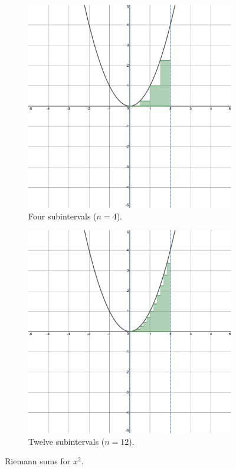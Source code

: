 \documentclass{article}
\begin{document}
\begin{figure}[h!]
    \centering
    \begin{subfigure}[b]{0.4\linewidth}
        \includegraphics[width=\linewidth]{Blender/Rsum4.png}
        \caption{Four subintervals ($n=4$).}
        \label{fig:4a}
    \end{subfigure}\hspace{3em}
    \begin{subfigure}[b]{0.4\linewidth}
        \includegraphics[width=\linewidth]{Blender/Rsum12.png}
        \caption{Twelve subintervals ($n=12$).}
        \label{fig:4b}
    \end{subfigure}
    \caption{Riemann sums for $x^2$.}
    \label{fig:4}
\end{figure}
\end{document}
